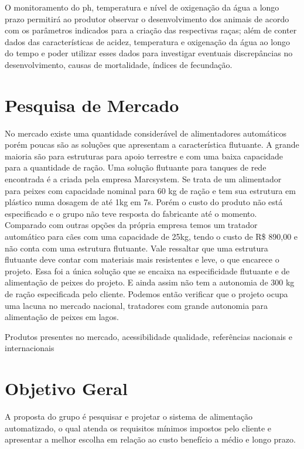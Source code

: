 O monitoramento do ph, temperatura e nível de oxigenação da água a longo prazo permitirá ao produtor observar o desenvolvimento dos animais de acordo com os parâmetros indicados para a criação das respectivas raças; além de conter dados das características de acidez, temperatura e oxigenação da água ao longo do tempo e poder utilizar esses dados para investigar eventuais discrepâncias no desenvolvimento, causas de mortalidade, índices de fecundação.

\section{Pesquisa de Mercado}

No mercado existe uma quantidade considerável de alimentadores automáticos porém poucas são as soluções que apresentam a característica flutuante. A grande maioria são para estruturas para apoio terrestre e com uma baixa capacidade para a quantidade de ração. Uma solução flutuante para tanques de rede encontrada é a criada pela empresa Marcsystem. Se trata de um alimentador para peixes com capacidade nominal para 60 kg de ração e tem sua estrutura em plástico numa dosagem de até 1kg em 7s\cite{Marcsystem}. Porém o custo do produto não está especificado e o grupo não teve resposta do fabricante até o momento. Comparado com outras opções da própria empresa temos um tratador automático para cães com uma capacidade de 25kg, tendo o custo de R\$ 890,00 e não conta com  uma estrutura flutuante. Vale ressaltar que uma estrutura flutuante deve contar com materiais mais resistentes e leve, o que encarece o projeto.
Essa foi a única solução que se encaixa na especificidade flutuante e de alimentação de peixes do projeto. E ainda assim não tem a autonomia de 300 kg de ração especificada pelo cliente. Podemos então verificar que o projeto ocupa uma lacuna no mercado nacional, tratadores com grande autonomia para alimentação de peixes em lagos.


Produtos presentes no mercado, acessibilidade qualidade, referências nacionais e internacionais

\section{Objetivo Geral}
A proposta do grupo é pesquisar e projetar o sistema de alimentação automatizado, o qual atenda os requisitos mínimos impostos pelo cliente e apresentar a melhor escolha em relação ao custo benefício a médio e longo prazo.

